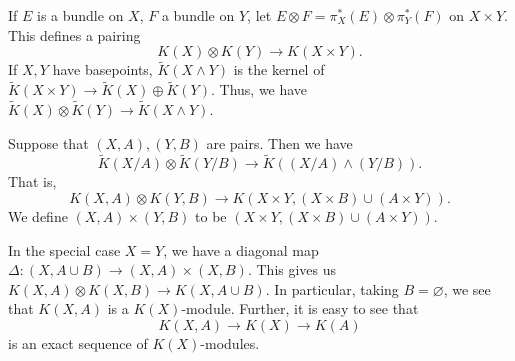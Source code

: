 \documentclass[leqno]{book}
\numberwithin{equation}{section}
\theoremstyle{definition}
\begin{document}
            If $E$ is a bundle on $X$, $F$ a bundle on $Y$, let $E \hat{\otimes }F=\pi_{X}^{*}(E)\otimes  \pi_{Y}^{*}(F)$ on $X\times Y$. This defines a pairing
            \begin{equation*}
              K(X)\otimes K(Y)\to K(X\times Y).
            \end{equation*}
            If $X,Y$ have basepoints, $\tilde{K}(X\wedge Y)$ is the kernel of $\tilde{K}(X\times Y)\to \tilde{K}(X)\oplus \tilde{K}(Y)$. Thus, we have $\tilde{K}(X)\otimes \tilde{K}(Y)\to \tilde{K}(X\wedge Y)$.

            Suppose that $(X,A),(Y,B)$ are pairs. Then we have
            \begin{equation*}
              \tilde{K}(X/A)\otimes \tilde{K}(Y/B)\to \tilde{K}((X/A)\wedge (Y/B)).
            \end{equation*}
            That is, 
            \begin{equation*}
              K(X,A)\otimes K(Y,B)\to K(X\times Y,(X\times B)\cup (A\times Y)).
            \end{equation*}
            We define $(X,A)\times (Y,B)$ to be $(X\times Y, (X\times B)\cup (A\times Y))$.

            In the special case $X=Y$, we have a diagonal map $\Delta:(X,A\cup B)\to (X,A)\times (X,B)$. This gives us $K(X,A)\otimes K(X,B)\to K(X,A\cup B)$. In particular, taking $B=\varnothing$, we see that $K(X,A)$ is a $K(X)$-module. Further, it is easy to see that
            \begin{equation*}
              K(X,A)\to K(X)\to K(A)
            \end{equation*}
            is an exact sequence of $K(X)$-modules.
\end{document}
